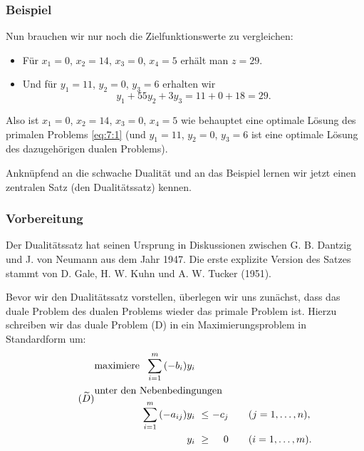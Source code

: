 \documentclass[smaller]{beamer}
\begin{document}
\begin{frame}
\frametitle{Beispiel}
\alert{Nun brauchen wir nur noch die Zielfunktionswerte zu vergleichen}: 
\begin{itemize}
\item Für $x_1=0$, $x_2=14$, $x_3=0$, $x_4=5$ erhält man $z=29$. 
\item Und für $y_1=11$, $y_2=0$, $y_3=6$ erhalten wir 
\[
y_1 + 55y_2 + 3y_3 = 11 + 0 + 18 = 29.
\]
\end{itemize}

Also ist $x_1=0$, $x_2=14$, $x_3=0$, $x_4=5$ wie behauptet eine optimale Lösung des primalen Problems \eqref{eq:7:1} (und $y_1=11$, $y_2=0$, $y_3=6$ ist eine optimale Lösung des dazugehörigen dualen Problems). \\ \vspace*{0.2cm}

Anknüpfend an die schwache Dualität und an das Beispiel lernen wir jetzt einen \alert{zentralen Satz (den Dualitätssatz)} kennen. 
\end{frame}

\begin{frame}
\frametitle{Vorbereitung}
 Der Dualitätssatz hat seinen Ursprung in Diskussionen zwischen G. B. Dantzig und J. von Neumann aus dem Jahr 1947. Die erste explizite Version des Satzes stammt von D. Gale, H. W. Kuhn und A. W. Tucker (1951). \\ \vspace*{0.2cm}

Bevor wir den Dualitätssatz vorstellen, überlegen wir uns zunächst, dass \alert{das duale Problem des dualen Problems wieder das primale Problem ist}. Hierzu schreiben wir das duale Problem (D) in ein Maximierungsproblem in Standardform um:
 \begin{align}
\tag{$\widetilde{D}$}
\begin{alignedat}{3}
& \text{maximiere } & \sum\limits_{i=1}^{m}{(-b_i)y_i} & & & \\
& \rlap{unter den Nebenbedingungen} & & & & \\
&& \sum\limits_{i=1}^{m}{(-a_{ij})y_i} &\ \leq &\ -c_j & \qquad (j=1,\ldots,n), \\
&&                                 y_i &\ \geq &\    0 & \qquad (i=1,\ldots,m).
\end{alignedat}
\end{align}
\end{frame}
\end{document}
